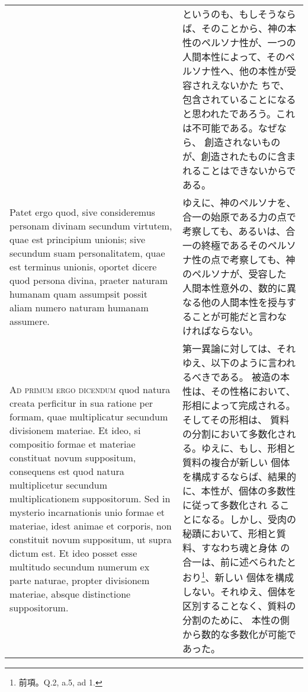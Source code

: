 \documentclass[10pt]{jsarticle} %
\begin{document}
\begin{longtable}{p{21em}p{21em}}
&

というのも、もしそうならば、そのことから、神の本性のペルソナ性が、一つの
 人間本性によって、そのペルソナ性へ、他の本性が受容されえないかた
 ちで、包含されていることになると思われたであろう。これは不可能である。なぜなら、
 創造されないものが、創造されたものに含まれることはできないからである。



\\

Patet ergo quod, sive
consideremus personam divinam secundum virtutem, quae est principium
unionis; sive secundum suam personalitatem, quae est terminus unionis,
oportet dicere quod persona divina, praeter naturam humanam quam
assumpsit possit aliam numero naturam humanam assumere.


&


ゆえに、神のペルソナを、合一の始原である力の点で考察しても、あるいは、合
 一の終極であるそのペルソナ性の点で考察しても、神のペルソナが、受容した
 人間本性意外の、数的に異なる他の人間本性を授与することが可能だと言わな
 ければならない。

\\



{\scshape Ad primum ergo dicendum} quod natura creata perficitur in sua ratione per
formam, quae multiplicatur secundum divisionem materiae. Et ideo, si
compositio formae et materiae constituat novum suppositum, consequens
est quod natura multiplicetur secundum multiplicationem
suppositorum. Sed in mysterio incarnationis unio formae et materiae,
idest animae et corporis, non constituit novum suppositum, ut supra
dictum est. Et ideo posset esse multitudo secundum numerum ex parte
naturae, propter divisionem materiae, absque distinctione suppositorum.


&


第一異論に対しては、それゆえ、以下のように言われるべきである。
被造の本性は、その性格において、形相によって完成される。そしてその形相は、
 質料の分割において多数化される。ゆえに、もし、形相と質料の複合が新しい
 個体を構成するならば、結果的に、本性が、個体の多数性に従って多数化され
 ることになる。しかし、受肉の秘蹟において、形相と質料、すなわち魂と身体
 の合一は、前に述べられたとおり\footnote{前項。Q.2, a.5, ad 1.}、新しい
 個体を構成しない。それゆえ、個体を区別することなく、質料の分割のために、
 本性の側から数的な多数化が可能であった。


\\




\end{longtable}
\end{document}
